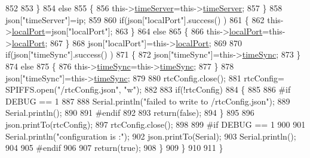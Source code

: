 \begin{DoxyCode}
852                 
853             \}
854             \textcolor{keywordflow}{else}
855             \{
856                 this->\hyperlink{classCoolTime_ad2b9858f399108cb440dd1e908916f04}{timeServer}=this->\hyperlink{classCoolTime_ad2b9858f399108cb440dd1e908916f04}{timeServer};
857             \}
858             json[\textcolor{stringliteral}{"timeServer"}]=ip;
859             
860             \textcolor{keywordflow}{if}(json[\textcolor{stringliteral}{"localPort"}].success() )
861             \{                       
862                 this->\hyperlink{classCoolTime_a2f777da44d7ba678be8185299e9b49d1}{localPort}=json[\textcolor{stringliteral}{"localPort"}];
863             \}
864             \textcolor{keywordflow}{else}
865             \{
866                 this->\hyperlink{classCoolTime_a2f777da44d7ba678be8185299e9b49d1}{localPort}=this->\hyperlink{classCoolTime_a2f777da44d7ba678be8185299e9b49d1}{localPort};
867             \}
868             json[\textcolor{stringliteral}{"localPort"}]=this->\hyperlink{classCoolTime_a2f777da44d7ba678be8185299e9b49d1}{localPort};
869 
870             \textcolor{keywordflow}{if}(json[\textcolor{stringliteral}{"timeSync"}].success() )
871             \{                       
872                 json[\textcolor{stringliteral}{"timeSync"}]=this->\hyperlink{classCoolTime_a9d032e76c3470a15b3bbbc52af6463f7}{timeSync};
873             \}
874             \textcolor{keywordflow}{else}
875             \{
876                 this->\hyperlink{classCoolTime_a9d032e76c3470a15b3bbbc52af6463f7}{timeSync}=this->\hyperlink{classCoolTime_a9d032e76c3470a15b3bbbc52af6463f7}{timeSync};
877             \}
878             json[\textcolor{stringliteral}{"timeSync"}]=this->\hyperlink{classCoolTime_a9d032e76c3470a15b3bbbc52af6463f7}{timeSync};
879 
880             rtcConfig.close();
881             rtcConfig= SPIFFS.open(\textcolor{stringliteral}{"/rtcConfig.json"}, \textcolor{stringliteral}{"w"});
882             
883             \textcolor{keywordflow}{if}(!rtcConfig)
884             \{
885             
886 \textcolor{preprocessor}{            #if DEBUG == 1 }
887 
888                 Serial.println(\textcolor{stringliteral}{"failed to write to /rtcConfig.json"});
889                 Serial.println();
890             
891 \textcolor{preprocessor}{            #endif }
892 
893                 \textcolor{keywordflow}{return}(\textcolor{keyword}{false});
894             \}
895             
896             json.printTo(rtcConfig);
897             rtcConfig.close();
898 
899 \textcolor{preprocessor}{        #if DEBUG == 1 }
900 
901             Serial.println(\textcolor{stringliteral}{"configuration is :"});
902             json.printTo(Serial);
903             Serial.println();
904         
905 \textcolor{preprocessor}{        #endif}
906         
907             \textcolor{keywordflow}{return}(\textcolor{keyword}{true}); 
908         \}
909     \}   
910 
911 \}
\end{DoxyCode}
